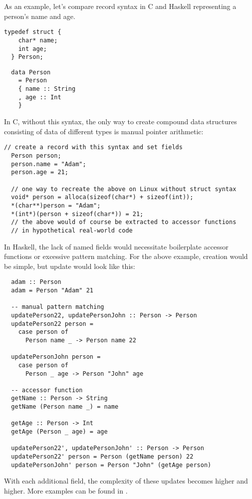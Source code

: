 \documentclass[en]{pracamgr}
\begin{document}
As an example, let's compare record syntax in C and Haskell representing a person's name and age.

\begin{lstlisting}[style=c]
  typedef struct {
    char* name;
    int age;
  } Person;
\end{lstlisting}

\begin{lstlisting}
  data Person 
    = Person 
    { name :: String
    , age :: Int
    }
\end{lstlisting}
In C, without this syntax, the only way to create compound data structures consisting of data of different types is manual pointer arithmetic:\\
\begin{minipage}{\linewidth}
\begin{lstlisting}[style=c]
  // create a record with this syntax and set fields
  Person person;
  person.name = "Adam";
  person.age = 21;

  // one way to recreate the above on Linux without struct syntax
  void* person = alloca(sizeof(char*) + sizeof(int));
  *(char**)person = "Adam";
  *(int*)(person + sizeof(char*)) = 21;
  // the above would of course be extracted to accessor functions
  // in hypothetical real-world code
\end{lstlisting}
\end{minipage}

In Haskell, the lack of named fields would necessitate boilerplate accessor functions or excessive pattern matching.
For the above example, creation would be simple, but update would look like this:
\begin{lstlisting}
  adam :: Person
  adam = Person "Adam" 21

  -- manual pattern matching
  updatePerson22, updatePersonJohn :: Person -> Person
  updatePerson22 person = 
    case person of
      Person name _ -> Person name 22

  updatePersonJohn person = 
    case person of
      Person _ age -> Person "John" age

  -- accessor function
  getName :: Person -> String
  getName (Person name _) = name
  
  getAge :: Person -> Int
  getAge (Person _ age) = age

  updatePerson22', updatePersonJohn' :: Person -> Person
  updatePerson22' person = Person (getName person) 22
  updatePersonJohn' person = Person "John" (getAge person)

\end{lstlisting}
With each additional field, the complexity of these updates becomes higher and higher.
More examples can be found in \cite{WikibooksHaskellDatatypes}.
\end{document}
